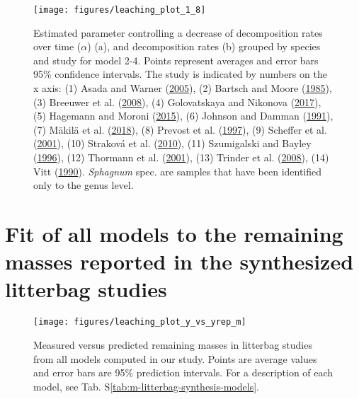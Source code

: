 \documentclass[
  12pt,
]{article}
\begin{document}
\begin{figure}[H]

{\centering \texttt{[image: figures/leaching\_plot\_1\_8]} 

}

\caption{Estimated parameter controlling a decrease of decomposition rates over time (\(\alpha\)) (a), and decomposition rates (b) grouped by species and study for model 2-4. Points represent averages and error bars 95\% confidence intervals. The study is indicated by numbers on the x axis: (1) Asada and Warner (\protect\hyperlink{ref-Asada.2005b}{2005}), (2) Bartsch and Moore (\protect\hyperlink{ref-Bartsch.1985}{1985}), (3) Breeuwer et al. (\protect\hyperlink{ref-Breeuwer.2008}{2008}), (4) Golovatskaya and Nikonova (\protect\hyperlink{ref-Golovatskaya.2017}{2017}), (5) Hagemann and Moroni (\protect\hyperlink{ref-Hagemann.2015}{2015}), (6) Johnson and Damman (\protect\hyperlink{ref-Johnson.1991}{1991}), (7) Mäkilä et al. (\protect\hyperlink{ref-Makila.2018}{2018}), (8) Prevost et al. (\protect\hyperlink{ref-Prevost.1997}{1997}), (9) Scheffer et al. (\protect\hyperlink{ref-Scheffer.2001}{2001}), (10) Straková et al. (\protect\hyperlink{ref-Strakova.2010}{2010}), (11) Szumigalski and Bayley (\protect\hyperlink{ref-Szumigalski.1996}{1996}), (12) Thormann et al. (\protect\hyperlink{ref-Thormann.2001}{2001}), (13) Trinder et al. (\protect\hyperlink{ref-Trinder.2008}{2008}), (14) Vitt (\protect\hyperlink{ref-Vitt.1990}{1990}). \emph{Sphagnum} spec. are samples that have been identified only to the genus level.}\label{fig:sup-out-mm-p5-1-8}
\end{figure}

\hypertarget{sup-8}{%
\section{Fit of all models to the remaining masses reported in the synthesized litterbag studies}\label{sup-8}}



\begin{figure}[H]

{\centering \texttt{[image: figures/leaching\_plot\_y\_vs\_yrep\_m]} 

}

\caption{Measured versus predicted remaining masses in litterbag studies from all models computed in our study. Points are average values and error bars are 95\% prediction intervals. For a description of each model, see Tab. S\ref{tab:m-litterbag-synthesis-models}.}\label{fig:sup-out-sdm-all-models-p1}
\end{figure}
\end{document}
